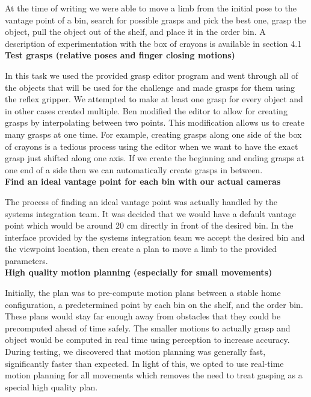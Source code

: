 \documentclass[12pt]{article}
\begin{document}
At the time of writing we were able to move a limb from the initial pose to the vantage point of a bin, search for possible grasps and pick the best one, grasp the object, pull the object out of the shelf, and place it in the order bin. A description of experimentation with the box of crayons is available in section 4.1\\

\noindent\textbf{Test grasps (relative poses and finger closing motions)}

In this task we used the provided grasp editor program and went through all of the objects that will be used for the challenge and made grasps for them using the reflex gripper. We attempted to make at least one grasp for every object and in other cases created multiple. Ben modified the editor to allow for creating grasps by interpolating between two points. This modification allows us to create many grasps at one time. For example, creating grasps along one side of the box of crayons is a tedious process using the editor when we want to have the exact grasp just shifted along one axis. If we create the beginning and ending grasps at one end of a side then we can automatically create grasps in between.\\

\noindent\textbf{Find an ideal vantage point for each bin with our actual cameras}

The process of finding an ideal vantage point was actually handled by the systems integration team. It was decided that we would have a default vantage point which would be around 20 cm directly in front of the desired bin. In the interface provided by the systems integration team we accept the desired bin and the viewpoint location, then create a plan to move a limb to the provided parameters.\\

\noindent\textbf{High quality motion planning (especially for small movements)}

Initially, the plan was to pre-compute motion plans between a stable home configuration, a predetermined point by each bin on the shelf, and the order bin. These plans would stay far enough away from obstacles that they could be precomputed ahead of time safely. The smaller motions to actually grasp and object would be computed in real time using perception to increase accuracy. During testing, we discovered that motion planning was generally fast, significantly faster than expected. In light of this, we opted to use real-time motion planning for all movements which removes the need to treat gasping as a special high quality plan.\\
\end{document}
